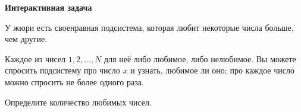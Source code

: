 \textbf{Интерактивная задача}

У жюри есть своенравная подсистема, которая любит некоторые числа больше, чем другие.

Каждое из чисел $1, 2, \ldots, N$ для неё либо любимое, либо нелюбимое. Вы можете спросить подсистему про число $x$ и узнать, любимое ли оно; про каждое число можно спросить не более одного раза.

Определите количество любимых чисел.
